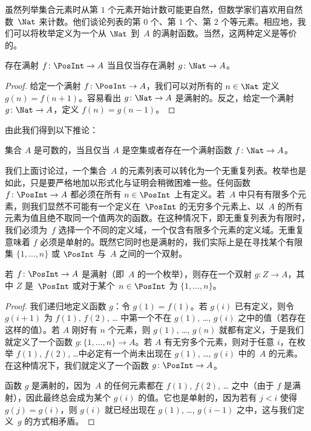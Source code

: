 \documentclass[../../../include/open-logic-section]{subfiles}
\begin{document}
虽然列举集合元素时从第 $1$ 个元素开始计数可能更自然，但数学家们喜欢用自然数~$\Nat$ 来计数。他们谈论列表的第 $0$ 个、第 $1$ 个、第 $2$ 个等元素。相应地，我们可以将枚举定义为一个从 $\Nat$ 到~$A$ 的满射函数。当然，这两种定义是等价的。

\begin{prop}
  存在满射 $f\colon \PosInt \to A$ 当且仅当存在满射 $g\colon \Nat \to A$。
\end{prop}

\begin{proof}
  给定一个满射 $f\colon \PosInt \to A$，我们可以对所有的 $n \in \Nat$ 定义 $g(n) =
  f(n+1)$。容易看出 $g\colon \Nat
  \to A$ 是满射的。反之，给定一个满射 $g\colon
  \Nat \to A$，定义 $f(n) = g(n-1)$。
\end{proof}

由此我们得到以下推论：

\begin{cor}
集合 $A$ 是可数的，当且仅当 $A$ 是空集或者存在一个满射函数 $f\colon \Nat \to A$。
\end{cor}

我们上面讨论过，一个集合~$A$ 的元素列表可以转化为一个无重复列表。枚举也是如此，只是要严格地加以形式化与证明会稍微困难一些。任何函数 $f\colon \PosInt \to A$ 都必须在所有 $n \in \PosInt$ 上有定义。若~$A$ 中只有有限多个元素，则我们显然不可能有一个定义在~$\PosInt$ 的无穷多个元素上、以~$A$ 的所有元素为值且绝不取同一个值两次的函数。在这种情况下，即无重复列表为有限时，我们必须为~$f$ 选择一个不同的定义域，一个仅含有限多个元素的定义域。无重复意味着 $f$ 必须是单射的。既然它同时也是满射的，我们实际上是在寻找某个有限集 $\{1, \dots, n\}$ 或 $\PosInt$ 与~$A$ 之间的一个双射。

\begin{prop}
若 $f\colon \PosInt \to A$ 是满射（即~$A$ 的一个枚举），则存在一个双射 $g\colon Z \to A$，其中 $Z$ 是~$\PosInt$ 或对于某个~$n \in \PosInt$ 为 $\{1, \dots, n\}$。
\end{prop}

\begin{proof}
  我们递归地定义函数 $g$：令 $g(1) = f(1)$。若 $g(i)$ 已有定义，则令 $g(i+1)$ 为 $f(1)$, $f(2)$, \dots{} 中第一个不在 $g(1)$, \dots, $g(i)$ 之中的值（若存在这样的值）。若 $A$ 刚好有 $n$ 个元素，则 $g(1)$, \dots, $g(n)$ 就都有定义，于是我们就定义了一个函数 $g\colon \{1, \dots, n\}
  \to A$。若 $A$ 有无穷多个元素，则对于任意 $i$，在枚举 $f(1)$, $f(2)$, \dots 中必定有一个尚未出现在 $g(1)$, \dots, $g(i)$ 中的~$A$ 的元素。在这种情况下，我们就定义了一个函数 $g\colon \PosInt \to A$。

  函数 $g$ 是满射的，因为~$A$ 的任何元素都在 $f(1)$, $f(2)$, \dots{} 之中（由于 $f$ 是满射），因此最终总会成为某个 $g(i)$ 的值。它也是单射的，因为若有 $j < i$ 使得 $g(j) = g(i)$，则 $g(i)$ 就已经出现在 $g(1)$, \dots, $g(i-1)$ 之中，这与我们定义~$g$ 的方式相矛盾。
\end{proof}
\end{document}
